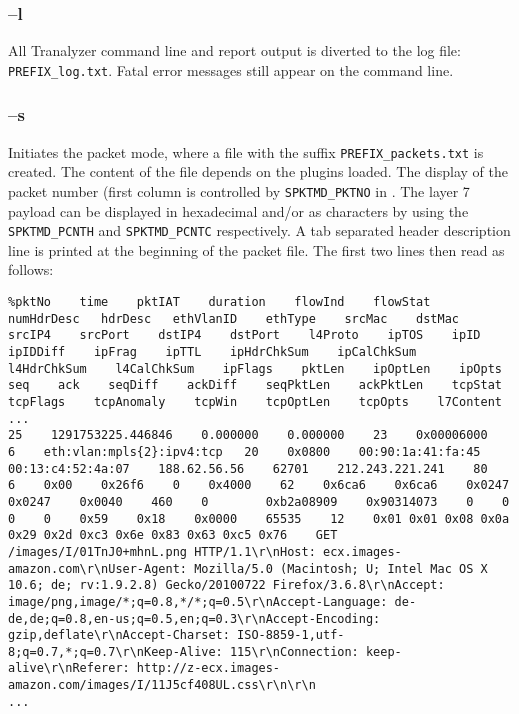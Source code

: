 \subsubsection{--l}\label{t2-loption}
All Tranalyzer command line and report output is diverted to the log file: {\tt PREFIX\_log.txt}.
Fatal error messages still appear on the command line.

\subsubsection{--s}
Initiates the packet mode, where a file with the suffix {\tt PREFIX\_packets.txt} is created. The content of the file depends on the plugins loaded.
The display of the packet number (first column is controlled by {\tt SPKTMD\_PKTNO} in . The layer 7 payload can be displayed in hexadecimal and/or as characters by using the {\tt SPKTMD\_PCNTH} and {\tt SPKTMD\_PCNTC} respectively.
A tab separated header description line is printed at the beginning of the packet file. The first two lines then read as follows:

\begin{center}
\begin{scriptsize}
\begin{lstlisting}
%pktNo    time    pktIAT    duration    flowInd    flowStat    numHdrDesc   hdrDesc   ethVlanID    ethType    srcMac    dstMac    srcIP4    srcPort    dstIP4    dstPort    l4Proto    ipTOS    ipID    ipIDDiff    ipFrag    ipTTL    ipHdrChkSum    ipCalChkSum    l4HdrChkSum    l4CalChkSum    ipFlags    pktLen    ipOptLen    ipOpts    seq    ack    seqDiff    ackDiff    seqPktLen    ackPktLen    tcpStat    tcpFlags    tcpAnomaly    tcpWin    tcpOptLen    tcpOpts    l7Content
...
25    1291753225.446846    0.000000    0.000000    23    0x00006000   6    eth:vlan:mpls{2}:ipv4:tcp   20    0x0800    00:90:1a:41:fa:45    00:13:c4:52:4a:07    188.62.56.56    62701    212.243.221.241    80    6    0x00    0x26f6    0    0x4000    62    0x6ca6    0x6ca6    0x0247    0x0247    0x0040    460    0        0xb2a08909    0x90314073    0    0    0    0    0x59    0x18    0x0000    65535    12    0x01 0x01 0x08 0x0a 0x29 0x2d 0xc3 0x6e 0x83 0x63 0xc5 0x76    GET /images/I/01TnJ0+mhnL.png HTTP/1.1\r\nHost: ecx.images-amazon.com\r\nUser-Agent: Mozilla/5.0 (Macintosh; U; Intel Mac OS X 10.6; de; rv:1.9.2.8) Gecko/20100722 Firefox/3.6.8\r\nAccept: image/png,image/*;q=0.8,*/*;q=0.5\r\nAccept-Language: de-de,de;q=0.8,en-us;q=0.5,en;q=0.3\r\nAccept-Encoding: gzip,deflate\r\nAccept-Charset: ISO-8859-1,utf-8;q=0.7,*;q=0.7\r\nKeep-Alive: 115\r\nConnection: keep-alive\r\nReferer: http://z-ecx.images-amazon.com/images/I/11J5cf408UL.css\r\n\r\n
...
\end{lstlisting}
\end{scriptsize}
\end{center}

